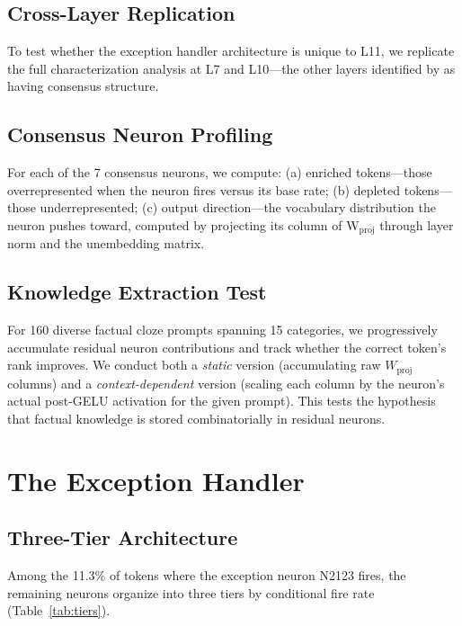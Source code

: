 \documentclass{article}
\begin{document}
\subsection{Cross-Layer Replication}

To test whether the exception handler architecture is unique to L11, we replicate
the full characterization analysis at L7 and L10---the other layers identified by
\citet{balogh2026discrete} as having consensus structure.

\subsection{Consensus Neuron Profiling}

For each of the 7 consensus neurons, we compute:
(a) enriched tokens---those overrepresented when the neuron fires versus its base rate;
(b) depleted tokens---those underrepresented;
(c) output direction---the vocabulary distribution the neuron pushes toward,
computed by projecting its column of W$_\text{proj}$ through layer norm and the
unembedding matrix.

\subsection{Knowledge Extraction Test}

For 160 diverse factual cloze prompts spanning 15 categories, we progressively
accumulate residual neuron contributions and track whether the correct token's
rank improves.
We conduct both a \emph{static} version (accumulating raw $W_\text{proj}$ columns)
and a \emph{context-dependent} version (scaling each column by the neuron's actual
post-GELU activation for the given prompt).
This tests the hypothesis that factual knowledge is stored combinatorially in
residual neurons.

\section{The Exception Handler}
\label{sec:exception}

\subsection{Three-Tier Architecture}

Among the 11.3\% of tokens where the exception neuron N2123 fires, the remaining
neurons organize into three tiers by conditional fire rate (Table~\ref{tab:tiers}).
\end{document}
